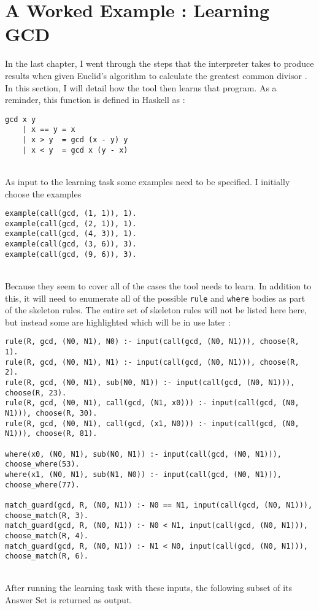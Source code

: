 \section{A Worked Example : Learning GCD}
In the last chapter, I went through the steps that the interpreter takes to produce results when given Euclid's algorithm to calculate the greatest common divisor \cite{Euclid}. In this section, I will detail how the tool then learns that program. As a reminder, this function is defined in Haskell as :

\begin{lstlisting}
gcd x y
	| x == y = x
	| x > y	 = gcd (x - y) y
	| x < y	 = gcd x (y - x)
\end{lstlisting}
\mbox{}\\
As input to the learning task some examples need to be specified. I initially choose the examples \\

\begin{lstlisting}
example(call(gcd, (1, 1)), 1).
example(call(gcd, (2, 1)), 1).
example(call(gcd, (4, 3)), 1).
example(call(gcd, (3, 6)), 3).
example(call(gcd, (9, 6)), 3).
\end{lstlisting}
\mbox{}\\
Because they seem to cover all of the cases the tool needs to learn. In addition to this, it will need to enumerate all of the possible \lstinline{rule} and \lstinline{where} bodies as part of the skeleton rules. The entire set of skeleton rules will not be listed here here, but instead some are highlighted which will be in use later : \\

\begin{lstlisting}
rule(R, gcd, (N0, N1), N0) :- input(call(gcd, (N0, N1))), choose(R, 1).
rule(R, gcd, (N0, N1), N1) :- input(call(gcd, (N0, N1))), choose(R, 2).
rule(R, gcd, (N0, N1), sub(N0, N1)) :- input(call(gcd, (N0, N1))), choose(R, 23).
rule(R, gcd, (N0, N1), call(gcd, (N1, x0))) :- input(call(gcd, (N0, N1))), choose(R, 30).
rule(R, gcd, (N0, N1), call(gcd, (x1, N0))) :- input(call(gcd, (N0, N1))), choose(R, 81).

where(x0, (N0, N1), sub(N0, N1)) :- input(call(gcd, (N0, N1))), choose_where(53).
where(x1, (N0, N1), sub(N1, N0)) :- input(call(gcd, (N0, N1))), choose_where(77).

match_guard(gcd, R, (N0, N1)) :- N0 == N1, input(call(gcd, (N0, N1))), choose_match(R, 3).
match_guard(gcd, R, (N0, N1)) :- N0 < N1, input(call(gcd, (N0, N1))), choose_match(R, 4).
match_guard(gcd, R, (N0, N1)) :- N1 < N0, input(call(gcd, (N0, N1))), choose_match(R, 6).
\end{lstlisting}
\mbox{}\\
After running the learning task with these inputs, the following subset of its Answer Set is returned as output. \\


